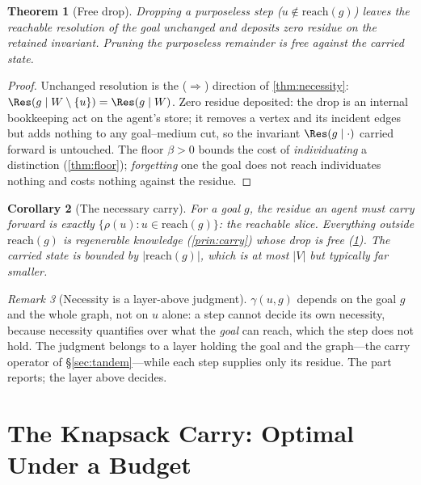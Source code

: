 \documentclass[11pt,a4paper]{article}
\theoremstyle{thmstyle}
\newtheorem{theorem}{Theorem}[section]
\newtheorem{corollary}[theorem]{Corollary}
\theoremstyle{definition}
\theoremstyle{remark}
\newtheorem{remark}[theorem]{Remark}
\newcommand{\Vrt}{V}
\newcommand{\flo}{\beta}                %
\newcommand{\res}{\rho}                 %
\newcommand{\goal}{g}                   %
\newcommand{\reach}{\mathrm{reach}}
\newcommand{\contrib}{\gamma}           %
\newcommand{\abs}[1]{\lvert#1\rvert}
\newcommand{\set}[1]{\{#1\}}
\begin{document}
\begin{theorem}[Free drop]
\label{thm:freedrop}
Dropping a purposeless step ($u\notin\reach(\goal)$) leaves the reachable
resolution of the goal unchanged and deposits zero residue on the retained
invariant. Pruning the purposeless remainder is free against the carried state.
\end{theorem}

\begin{proof}
Unchanged resolution is the ($\Rightarrow$) direction of \cref{thm:necessity}:
$\Res(\goal\mid W\setminus\set u)=\Res(\goal\mid W)$. Zero residue deposited: the
drop is an internal bookkeeping act on the agent's store; it removes a vertex and
its incident edges but adds nothing to any goal--medium cut, so the invariant
$\Res(\goal\mid\cdot)$ carried forward is untouched. The floor $\flo>0$ bounds the
cost of \emph{individuating} a distinction (\cref{thm:floor}); \emph{forgetting}
one the goal does not reach individuates nothing and costs nothing against the
residue.
\end{proof}

\begin{corollary}[The necessary carry]
\label{cor:necessary-carry}
For a goal $\goal$, the residue an agent must carry forward is exactly
$\set{\res(u):u\in\reach(\goal)}$: the reachable slice. Everything outside
$\reach(\goal)$ is regenerable knowledge (\cref{prin:carry}) whose drop is free
(\cref{thm:freedrop}). The carried state is bounded by
$\abs{\reach(\goal)}$, which is at most $\abs\Vrt$ but typically far smaller.
\end{corollary}

\begin{remark}[Necessity is a layer-above judgment]
\label{rem:above}
$\contrib(u,\goal)$ depends on the goal $\goal$ and the whole graph, not on $u$
alone: a step cannot decide its own necessity, because necessity quantifies over
what the \emph{goal} can reach, which the step does not hold. The judgment
belongs to a layer holding the goal and the graph---the carry operator of
\S\ref{sec:tandem}---while each step supplies only its residue. The part reports;
the layer above decides.
\end{remark}

\section{The Knapsack Carry: Optimal Under a Budget}
\label{sec:knapsack}
\end{document}
